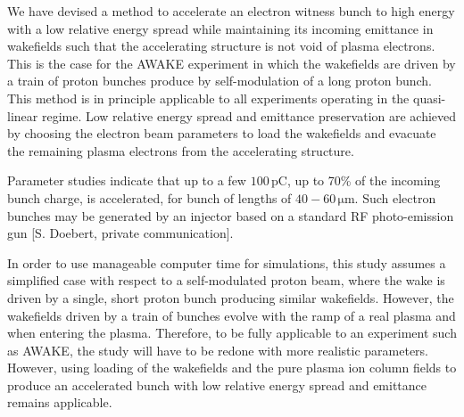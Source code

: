 \documentclass[aps,prstab,reprint,amsmath,amssymb,groupedaddress,onecolumn]{revtex4-1}
\newcommand{\unit}[1]{\,\mathrm{#1}}
\begin{document}


We have devised a method to accelerate an electron witness bunch to high energy with a low relative energy spread while maintaining its incoming emittance in wakefields such that the accelerating structure is not void of plasma electrons. This is the case for the AWAKE experiment in which the wakefields are driven by a train of proton bunches produce by self-modulation of a long proton bunch. This method is in principle applicable to all experiments operating in the quasi-linear regime. Low relative energy spread and emittance preservation are achieved by choosing the electron beam parameters to load the wakefields and evacuate the remaining plasma electrons from the accelerating structure.
 
Parameter studies indicate that up to a few $100\unit{pC}$, up to 70\% of the incoming bunch charge, is accelerated, for bunch of lengths of $40-60\unit{\mu m}$. Such electron bunches may be generated by an injector based on a standard RF photo-emission gun [S. Doebert, private communication].

In order to use manageable computer time for simulations, this study assumes a simplified case with respect to a self-modulated proton beam, where the wake is driven by a single, short proton bunch producing similar wakefields. However, the wakefields driven by a train of bunches evolve with the ramp of a real plasma and when entering the plasma. Therefore, to be fully applicable to an experiment such as AWAKE, the study will have to be redone with more realistic parameters. However, using loading of the wakefields and the pure plasma ion column fields to produce an accelerated bunch with low relative energy spread and emittance remains applicable. 
\end{document}
